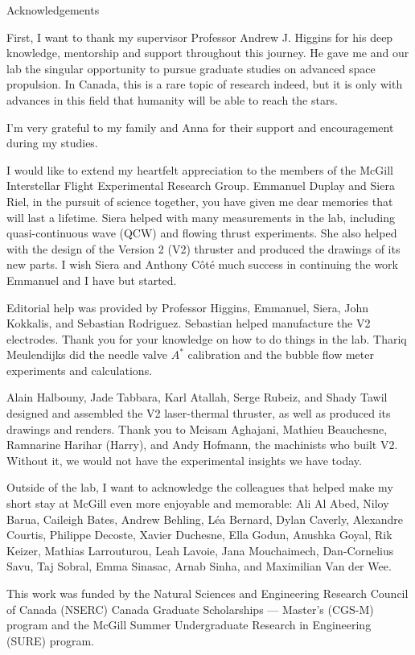 \begin{plainchp}{Acknowledgements}
    
    First, I want to thank my supervisor Professor Andrew J. Higgins for his deep knowledge, mentorship and support throughout this journey. He gave me and our lab the singular opportunity to pursue graduate studies on advanced space propulsion. In Canada, this is a rare topic of research indeed, but it is only with advances in this field that humanity will be able to reach the stars.

    I'm very grateful to my family and Anna for their support and encouragement during my studies.

    I would like to extend my heartfelt appreciation to the members of the McGill Interstellar Flight Experimental Research Group. Emmanuel Duplay and Siera Riel, in the pursuit of science together, you have given me dear memories that will last a lifetime. Siera helped with many measurements in the lab, including quasi-continuous wave (QCW) and flowing thrust experiments. She also helped with the design of the Version 2 (V2) thruster and produced the drawings of its new parts. I wish Siera and Anthony Côté much success in continuing the work Emmanuel and I have but started.

    Editorial help was provided by Professor Higgins, Emmanuel, Siera, John Kokkalis, and Sebastian Rodriguez. Sebastian helped manufacture the V2 electrodes. Thank you for your knowledge on how to do things in the lab. Thariq Meulendijks did the needle valve $A^*$ calibration and the bubble flow meter experiments and calculations.

    Alain Halbouny, Jade Tabbara, Karl Atallah, Serge Rubeiz, and Shady Tawil designed and assembled the V2 laser-thermal thruster, as well as produced its drawings and renders. Thank you to Meisam Aghajani, Mathieu Beauchesne, Ramnarine Harihar (Harry), and Andy Hofmann, the machinists who built V2. Without it, we would not have the experimental insights we have today.

    Outside of the lab, I want to acknowledge the colleagues that helped make my short stay at McGill even more enjoyable and memorable: Ali Al Abed, Niloy Barua, Caileigh Bates, Andrew Behling, Léa Bernard, Dylan Caverly, Alexandre Courtis, Philippe Decoste, Xavier Duchesne, Ella Godun, Anushka Goyal, Rik Keizer, Mathias Larrouturou, Leah Lavoie, Jana Mouchaimech, Dan-Cornelius Savu, Taj Sobral, Emma Sinasac, Arnab Sinha, and Maximilian Van der Wee.

    This work was funded by the Natural Sciences and Engineering Research Council of Canada (NSERC) Canada Graduate Scholarships — Master's (CGS-M) program and the McGill Summer Undergraduate Research in Engineering (SURE) program.

\end{plainchp}